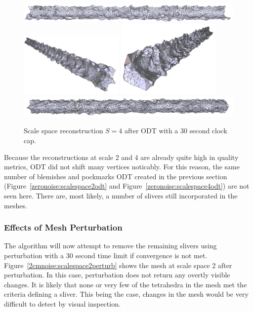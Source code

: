\documentclass[12pt]{drexelthesis}
\let\Oldsubsubsection\subsubsection
\renewcommand{\subsubsection}{\FloatBarrier\Oldsubsubsection}
\begin{document}
\begin{figure}[!ht]
	\centering
		\includegraphics[width=5in]{simulated-lab-scan/2cmnoise/optimizedNeat/scalespace4odt00.png}
		\includegraphics[width=2in]{simulated-lab-scan/2cmnoise/optimizedNeat/scalespace4odt01.png}
		\includegraphics[width=2in]{simulated-lab-scan/2cmnoise/optimizedNeat/scalespace4odt02.png}
		\includegraphics[width=5in]{simulated-lab-scan/2cmnoise/optimizedNeat/scalespace4odt03.png}
		\caption[Scale space reconstruction $S = 4$ after ODT with a 30 second clock cap]{\centering Scale space reconstruction $S = 4$ after ODT with a 30 second clock cap.}
	\label{2cmnoise:scalespace4odt}
\end{figure}

Because the reconstructions at scale 2 and 4 are already quite high in quality metrics, ODT did not shift many vertices noticably. For this reason, the same number of blemishes and pockmarks ODT created in the previous section (Figure~\ref{zeronoise:scalespace2odt} and Figure~\ref{zeronoise:scalespace4odt}) are not seen here. There are, most likely, a number of slivers still incorporated in the meshes.

\subsubsection{Effects of Mesh Perturbation}

The algorithm will now attempt to remove the remaining slivers using perturbation with a 30 second time limit if convergence is not met. Figure~\ref{2cmnoise:scalespace2perturb} shows the mesh at scale space 2 after perturbation. In this case, perturbation does not return any overtly visible changes. It is likely that none or very few of the tetrahedra in the mesh met the criteria defining a sliver. This being the case, changes in the mesh would be very difficult to detect by visual inspection.
\end{document}
